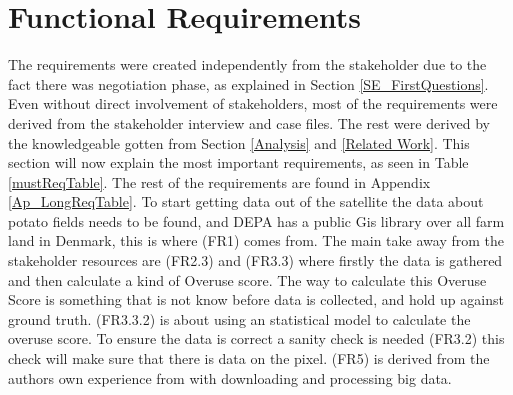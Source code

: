 \section{Functional Requirements}\label{SE_FunctionalReqs}
The requirements were created independently from the stakeholder due to the fact there was negotiation phase, as explained in Section \ref{SE_FirstQuestions}. Even without direct involvement of stakeholders, most of the requirements were derived from the stakeholder interview and case files. The rest were derived by the knowledgeable gotten from Section \ref{Analysis} and \ref{Related Work}. 
This section will now explain the most important requirements, as seen in Table \ref{mustReqTable}. The rest of the requirements are found in Appendix \ref{Ap_LongReqTable}.
To start getting data out of the satellite the data about potato fields needs to be found, and \acrshort{DEPA} has a public Gis library over all farm land in Denmark, this is where (FR1) comes from. 
The main take away from the stakeholder resources are (FR2.3) and (FR3.3) where firstly the data is gathered and then calculate a kind of Overuse score. The way to calculate this Overuse Score is something that is not know before data is collected, and hold up against ground truth. (FR3.3.2) is about using an statistical model to calculate the overuse score. To ensure the data is correct a sanity check is needed (FR3.2) this check will make sure that there is data on the pixel. 
(FR5) is derived from the authors own experience from with downloading and processing big data. 

